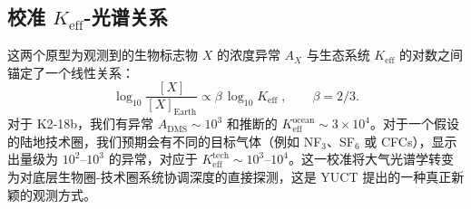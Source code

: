 \documentclass[11pt,a4paper]{article}
\begin{document}
	\subsection{校准 \(K_{\mathrm{eff}}\)-光谱关系}
	这两个原型为观测到的生物标志物 \(X\) 的浓度异常 \(A_X\) 与生态系统 \(K_{\mathrm{eff}}\) 的对数之间锚定了一个线性关系：
	\begin{equation}
		\log_{10} \frac{[X]}{[X]_{\mathrm{Earth}}} \propto
		\beta\,\log_{10} K_{\mathrm{eff}} \; , \qquad \beta = 2/3 .
	\end{equation}
	对于 K2-18b，我们有异常 \(A_{\mathrm{DMS}} \sim 10^3\) 和推断的 \(K_{\mathrm{eff}}^{\mathrm{ocean}} \sim 3\times10^4\)。对于一个假设的陆地技术圈，我们预期会有不同的目标气体（例如 NF$_3$、SF$_6$ 或 CFCs），显示出量级为 \(10^2\)–\(10^3\) 的异常，对应于 \(K_{\mathrm{eff}}^{\mathrm{tech}} \sim 10^3\)–\(10^4\)。这一校准将大气光谱学转变为对底层生物圈-技术圈系统协调深度的直接探测，这是 YUCT 提出的一种真正新颖的观测方式。
	
\end{document}

